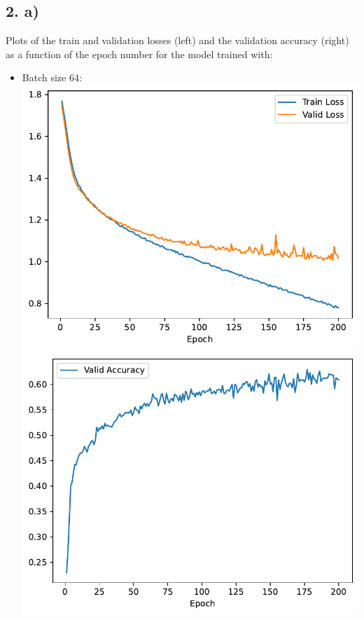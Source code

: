 \documentclass[12pt,a4paper]{article}
\begin{document}
    \subsection{2. a)}
        Plots of the train and validation losses (left) and the validation accuracy (right) as a function of the epoch number for the model trained with:
        \begin{itemize}
            \item Batch size 64: \\
                \includegraphics[width=\imagewidth]{q2/q2_2a_default-training-loss.pdf}
                \includegraphics[width=\imagewidth]{q2/q2_2a_default-validation-accuracy.pdf} \\

\end{itemize}
\end{document}
